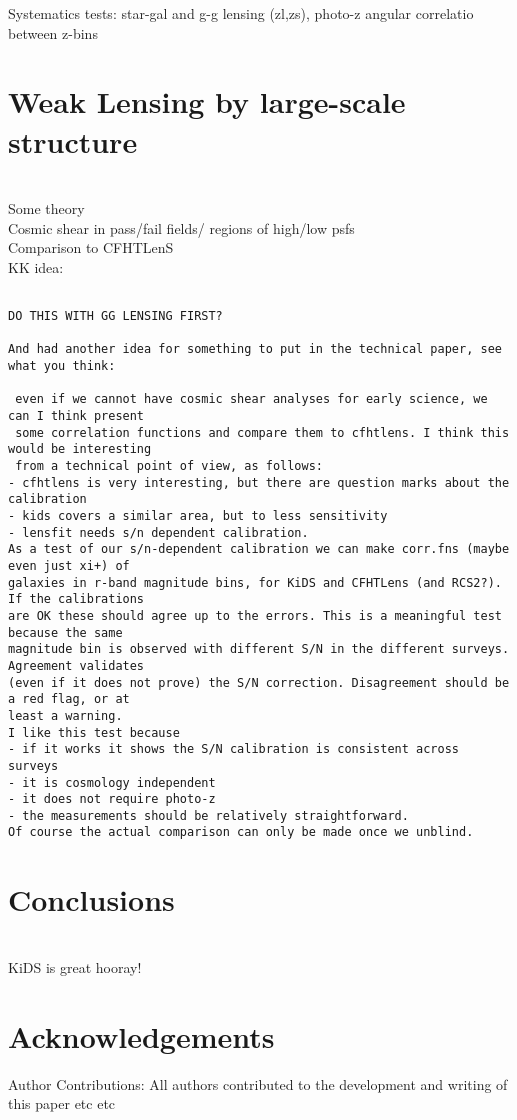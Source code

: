 \documentclass[useAMS,usenatbib,times,letter,amssymb]{mn2e}
\newcommand{\red}[1]{{\color{red}{#1}}}
\begin{document}
Systematics tests: star-gal and g-g lensing (zl,zs), photo-z angular correlatio between z-bins

\section{Weak Lensing by large-scale structure}
\red{KK/CH} \\
Some theory\\
Cosmic shear in pass/fail fields/ regions of high/low psfs\\
Comparison to CFHTLenS\\
KK idea:
\begin{verbatim}

DO THIS WITH GG LENSING FIRST?

And had another idea for something to put in the technical paper, see what you think:

 even if we cannot have cosmic shear analyses for early science, we can I think present
 some correlation functions and compare them to cfhtlens. I think this would be interesting
 from a technical point of view, as follows:
- cfhtlens is very interesting, but there are question marks about the calibration
- kids covers a similar area, but to less sensitivity
- lensfit needs s/n dependent calibration.
As a test of our s/n-dependent calibration we can make corr.fns (maybe even just xi+) of 
galaxies in r-band magnitude bins, for KiDS and CFHTLens (and RCS2?). If the calibrations 
are OK these should agree up to the errors. This is a meaningful test because the same 
magnitude bin is observed with different S/N in the different surveys. Agreement validates 
(even if it does not prove) the S/N correction. Disagreement should be a red flag, or at 
least a warning.
I like this test because 
- if it works it shows the S/N calibration is consistent across surveys
- it is cosmology independent 
- it does not require photo-z
- the measurements should be relatively straightforward.
Of course the actual comparison can only be made once we unblind.
\end{verbatim}


\section{Conclusions}
\red{KK}\\
KiDS is great hooray!






\section{Acknowledgements}

{\small Author Contributions: All authors contributed to the development and writing of this paper etc etc}



\label{lastpage}
\end{document}
